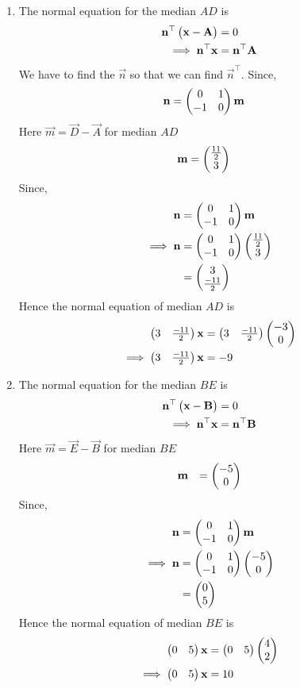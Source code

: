 \documentclass[11pt]{book}
\begin{document}
\begin{enumerate}[label=\thesection.\arabic*.,ref=\thesection.\theenumi]
\begin{enumerate}
 \item The normal equation for the median $AD$ is
  \begin{align}
    \mathbf{n}^{\top}\begin{pmatrix}\mathbf{x}-\mathbf{A}\end{pmatrix}&=0\\
    \implies
    \mathbf{n}^{\top}\mathbf{x}&=\mathbf{n}^{\top}\mathbf{A}
  \end{align}
 We have to find the $\vec{n}$ so that we can find $\vec{n}^{\top}$.
 Since,
\begin{align}
  \mathbf{n} &= \begin{pmatrix}0 & 1\\
  -1 & 0\end{pmatrix}\mathbf{m}
\end{align}
Here $\vec{m} = \vec{D}- \vec{A}$ for median $AD$
\begin{align}
\mathbf{m}&=\begin{pmatrix}\frac{11}{2}\\3\end{pmatrix}
\end{align}
Since,
\begin{align}
  \mathbf{n} &= \begin{pmatrix}0 & 1\\
  -1 & 0\end{pmatrix}\mathbf{m}\\
\implies
\mathbf{n} &= \begin{pmatrix}0 & 1\\
  -1 & 0\end{pmatrix}\begin{pmatrix}\frac{11}{2}\\3\end{pmatrix}\\
        &= \begin{pmatrix}3 \\\frac{-11}{2}\end{pmatrix}
\end{align}
Hence the normal equation of median $AD$ is 
\begin{align}
    \begin{pmatrix}3 & \frac{-11}{2}\end{pmatrix}\mathbf{x}&=\begin{pmatrix}3 & \frac{-11}{2}\end{pmatrix}\begin{pmatrix}-3\\0\end{pmatrix}\\
    \implies
    \begin{pmatrix}3 & \frac{-11}{2}\end{pmatrix}\mathbf{x}&={-9}
\end{align}

\item The normal equation for the median $BE$ is
\begin{align}
\mathbf{n}^{\top}\begin{pmatrix}\mathbf{x}-\mathbf{B}\end{pmatrix}&=0\\
\implies
\mathbf{n}^{\top}\mathbf{x}&=\mathbf{n}^{\top}\mathbf{B}
\end{align}
Here $\vec{m} = \vec{E}- \vec{B}$ for median $BE$
\begin{align}
\mathbf{m}&&=\begin{pmatrix}-5\\0\end{pmatrix}
\end{align}
Since,
\begin{align}
  \mathbf{n} &= \begin{pmatrix}0 & 1\\
  -1 & 0\end{pmatrix}\mathbf{m}\\
\implies
\mathbf{n} &= \begin{pmatrix}0 & 1\\
  -1 & 0\end{pmatrix}\begin{pmatrix}-5\\0\end{pmatrix}\\
        &= \begin{pmatrix}0\\ 5\end{pmatrix}
\end{align}
Hence the normal equation of median $BE$ is 
\begin{align}
    \begin{pmatrix}0 & 5\end{pmatrix}\mathbf{x}&=\begin{pmatrix}0 & 5\end{pmatrix}\begin{pmatrix}4\\2\end{pmatrix}\\
\implies
    \begin{pmatrix}0 & 5\end{pmatrix}\mathbf{x}&={10}
\end{align}


\end{enumerate}
\end{enumerate}
\end{document}
